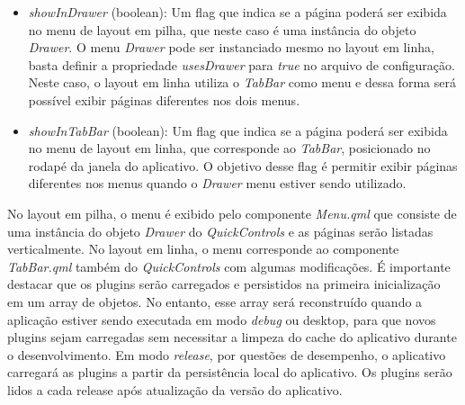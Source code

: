 \begin{itemize}
	\item \textit{showInDrawer} (boolean): Um flag que indica se a página poderá ser exibida no menu de layout em pilha, que neste caso é uma instância do objeto \textit{Drawer}. O menu \textit{Drawer} pode ser instanciado mesmo no layout em linha, basta definir a propriedade \textit{usesDrawer} para \textit{true} no arquivo de configuração. Neste caso, o layout em linha utiliza o \textit{TabBar} como menu e dessa forma será possível exibir páginas diferentes nos dois menus.

	\item \textit{showInTabBar} (boolean): Um flag que indica se a página poderá ser exibida no menu de layout em linha, que corresponde ao \textit{TabBar}, posicionado no rodapé da janela do aplicativo. O objetivo desse flag é permitir exibir páginas diferentes nos menus quando o \textit{Drawer} menu estiver sendo utilizado.
\end{itemize}

No layout em pilha, o menu é exibido pelo componente \textit{Menu.qml} que consiste de uma instância do objeto \textit{Drawer} do \textit{QuickControls} e as páginas serão listadas verticalmente. No layout em linha, o menu corresponde ao componente \textit{TabBar.qml} também do \textit{QuickControls} com algumas modificações. É importante destacar que os plugins serão carregados e persistidos na primeira inicialização em um array de objetos. No entanto, esse array será reconstruído quando a aplicação estiver sendo executada em modo \textit{debug} ou desktop, para que novos plugins sejam carregadas sem necessitar a limpeza do cache do aplicativo durante o desenvolvimento. Em modo \textit{release}, por questões de desempenho, o aplicativo carregará as plugins a partir da persistência local do aplicativo. Os plugins serão lidos a cada release após atualização da versão do aplicativo.\par


